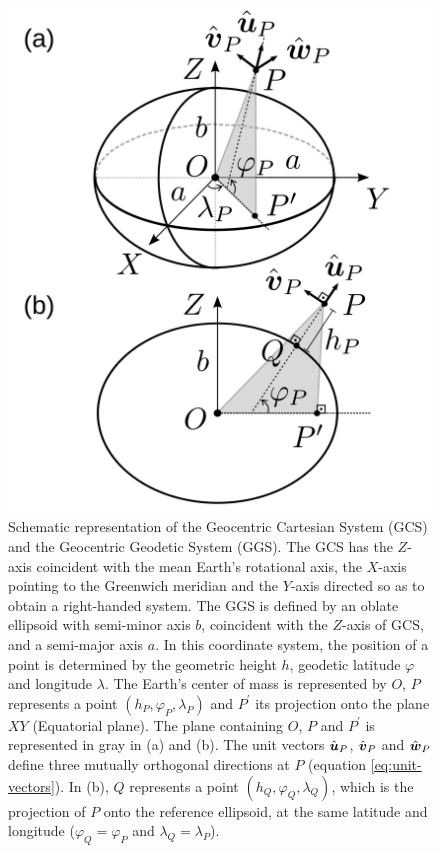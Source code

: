 \documentclass[extra]{gji}
\begin{document}
\begin{figure}
    \includegraphics{figures/cartesian-geodetic-systems.png}
    \caption{Schematic representation of the Geocentric Cartesian System (GCS) and the Geocentric Geodetic System (GGS). The GCS has the $Z$-axis coincident with the mean Earth's rotational axis,
    the $X$-axis pointing to the Greenwich meridian and the $Y$-axis
    directed so as to obtain a right-handed system. The GGS is      defined by an oblate ellipsoid with semi-minor axis $b$, 
    coincident with the $Z$-axis of GCS, and a semi-major
    axis $a$. In this coordinate system, the position of a point is
    determined by the geometric height $h$, geodetic latitude 
    $\varphi$ and longitude $\lambda$. 
    The Earth's center of mass is represented 
    by $O$, $P$ represents a point $(h_{P}, \varphi_{P}, \lambda_{P})$ and $P^{\prime}$ its projection onto the plane $XY$ 
    (Equatorial plane). The plane containing $O$, $P$ and 
    $P^{\prime}$ is represented in gray in (a) and (b). 
    The unit vectors $\hat{\mitbf{u}}_{P}$, $\hat{\mitbf{v}}_{P}$ and 
    $\hat{\mitbf{w}}_{P}$ define three mutually orthogonal 
    directions at $P$ (equation \ref{eq:unit-vectors}).
    In (b), $Q$ represents a point $(h_{Q}, \varphi_{Q}, \lambda_{Q})$,
    which is the projection of $P$ onto the reference ellipsoid, at
    the same latitude and longitude ($\varphi_{Q} = \varphi_{P}$ and $\lambda_{Q} = \lambda_{P}$).}
  \label{fig:GCS-GGS}
\end{figure}
\end{document}
